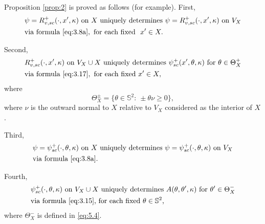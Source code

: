 \documentclass[10pt,a4paper]{amsart}
\theoremstyle{definition}
\begin{document}
Proposition \ref{prop:2} is proved as follows (for example).
First,
\begin{equation}\label{eq:5.2}
\begin{aligned}
&\psi=R_{v,sc}^+(\cdot, x', \kappa)\text{ on}\ X\text{ uniquely determines}\ \psi=R_{v,sc}^+(\cdot, x', \kappa)\text{ on}\ V_X\\
&\mbox{\rm via formula}\ \eqref{eq:3.8a}, \text{ for each fixed }\ x' \in X.
\end{aligned}
\end{equation}

Second,
\begin{equation}\label{eq:5.3}
\begin{aligned}
&R_{v,sc}^+(\cdot, x', \kappa)\text{ on}\ V_X \cup X\text{ uniquely determines}\ \psi_{sc}^+(x',\theta,\kappa)\text{ for}\ \theta \in \Theta_X^+\\
&\mbox{\rm via formula}\ \eqref{eq:3.17}, \text{ for each fixed}\ x' \in X,
\end{aligned}
\end{equation}
where
\begin{equation}
\label{eq:5.4}
\Theta_X^{\pm}=\{\theta \in\mathbb S^2:\ \pm\theta\nu \geq 0 \},
\end{equation}
where $\nu$ is the outward normal to $X$ relative to $V_X$ considered as the interior of $X$.

Third,
\begin{equation}
\begin{aligned}
&\psi=\psi_{sc}^+(\cdot, \theta,\kappa)\text{ on}\ X\text{ uniquely determines}\ \psi=\psi_{sc}^+(\cdot, \theta,\kappa)\text{ on}\ V_X \label{eq:5.5}\\
&\text{via formula \eqref{eq:3.8a}}.
\end{aligned}
\end{equation}

Fourth,\vspace*{-3pt}
\begin{equation}\label{eq:5.6}
\begin{aligned}
&\psi_{sc}^+(\cdot, \theta,\kappa)\text{ on}\ V_X \cup X\text{ uniquely determines}\ A(\theta, \theta', \kappa)\text{ for}\ \theta' \in \Theta_X^-\\
&\text{via formula \eqref{eq:3.15},  for each fixed $\theta \in\mathbb S^2$,}
\end{aligned}
\end{equation}
where $\Theta_X^-$ is defined in \eqref{eq:5.4}.
\end{document}
